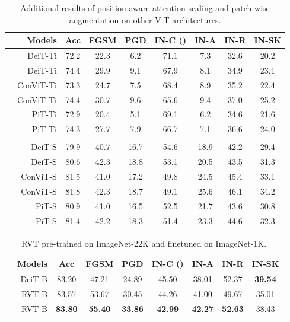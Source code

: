 \documentclass[10pt,twocolumn,letterpaper]{article}
\begin{document}
\begin{table*}[h]
\footnotesize
    \centering
\begin{tabular}{lr|c|c|c|c|c|c|c}
\toprule
&Models & Acc & FGSM & PGD & IN-C () & IN-A & IN-R & IN-SK  \\
\midrule

&DeiT-Ti   & 72.2 & 22.3 &6.2 & 71.1 & 7.3 &32.6 & 20.2\\ 
&DeiT-Ti & 74.4 & 29.9 & 9.1 & 67.9 & 8.1 & 34.9 & 23.1  \\
&ConViT-Ti & 73.3 & 24.7 & 7.5 & 68.4 & 8.9 & 35.2 & 22.4  \\ 
&ConViT-Ti & 74.4 & 30.7 & 9.6 &65.6 &9.4 & 37.0 & 25.2 \\
&PiT-Ti & 72.9 & 20.4 & 5.1 & 69.1 & 6.2 & 34.6 & 21.6 \\
&PiT-Ti & 74.3 & 27.7 & 7.9 & 66.7 & 7.1 & 36.6 & 24.0 \\
\\

&DeiT-S   & 79.9 & 40.7 &16.7 & 54.6 & 18.9 &42.2 & 29.4\\ 
&DeiT-S & 80.6 & 42.3 & 18.8 & 53.1 & 20.5 & 43.5 & 31.3  \\
&ConViT-S & 81.5 & 41.0 & 17.2 & 49.8 & 24.5 & 45.4 & 33.1  \\ 
&ConViT-S & 81.8 & 42.3 & 18.7 & 49.1 & 25.6 & 46.1 & 34.2 \\
&PiT-S & 80.9 & 41.0 & 16.5 & 52.5 & 21.7 & 43.6 & 30.8 \\
&PiT-S & 81.4 & 42.2 & 18.3 & 51.4 & 23.3 & 44.6 & 32.3 \\
\bottomrule
\end{tabular}
\vspace{2mm}
    \caption{Additional results of position-aware attention scaling and patch-wise augmentation on other ViT architectures.}
    \label{tab:appendix_othervit}
\end{table*}

\begin{table*}[h]
\footnotesize
    \centering
\begin{tabular}{lr|c|c|c|c|c|c|c}
\toprule
&Models & Acc & FGSM & PGD & IN-C () & IN-A & IN-R & IN-SK  \\
\midrule

&DeiT-B   & 83.20 & 47.21 &24.89 & 45.50 & 38.01 &52.37 & \textbf{39.54}\\ 
&RVT-B & 83.57 & 53.67 & 30.45 & 44.26 & 41.00 & 49.67 & 35.01  \\
&RVT-B & \textbf{83.80} & \textbf{55.40} & \textbf{33.86} & \textbf{42.99} & \textbf{42.27} & \textbf{52.63} & 38.43 \\

\bottomrule
\end{tabular}
\vspace{2mm}
    \caption{RVT pre-trained on ImageNet-22K and finetuned on ImageNet-1K.}
    \label{tab:appendix_finetune22k}
\end{table*}
\end{document}
